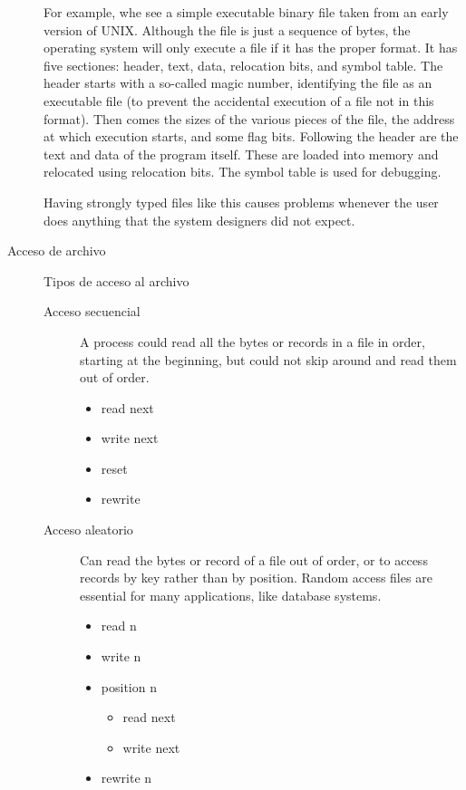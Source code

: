 \documentclass[a4paper, twoside]{article}
\begin{document}
\begin{description}
	For example, whe see a simple executable binary file taken from an early version of UNIX. Although the file is just a sequence of bytes, the operating system will only execute a file if it has the proper format. It has five sectiones: header, text, data, relocation bits, and symbol table. The header starts with a so-called magic number, identifying the file as an executable file (to prevent the accidental execution of a file not in this format). Then comes the sizes of the various pieces of the file, the address at which execution starts, and some flag bits. Following the header are the text and data of the program itself. These are loaded into memory and relocated using relocation bits. The symbol table is used for debugging.

	Having strongly typed files like this causes problems whenever the user does anything that the system designers did not expect.
	
	\item[Acceso de archivo] Tipos de acceso al archivo
	\begin{description}
		\item[Acceso secuencial] A process could read all the bytes or records in a file in order, starting at the beginning, but could not skip around and read them out of order.
		\begin{itemize}
			\item read next
			\item write next
			\item reset
			\item rewrite
		\end{itemize}

		\item[Acceso aleatorio] Can read the bytes or record of a file out of order, or to access records by key rather than by position. Random access files are essential for many applications, like database systems.
		\begin{itemize}
			\item read n
			\item write n
			\item position n
			\begin{itemize}
				\item read next
				\item write next
			\end{itemize}
			\item rewrite n
		\end{itemize}
	\end{description}


\end{description}
\end{document}
